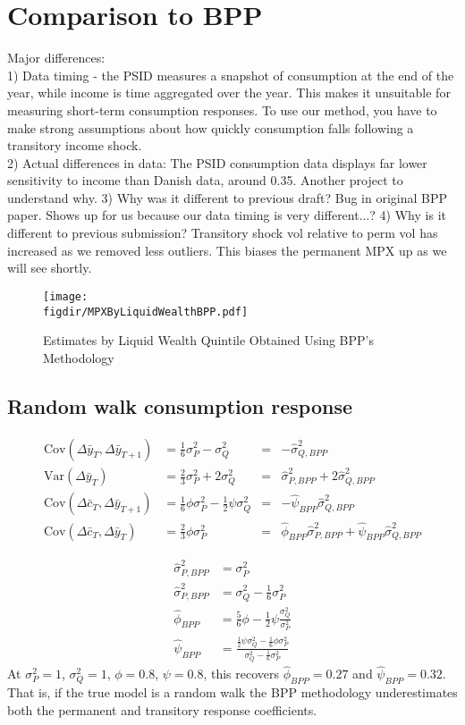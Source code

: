 \documentclass[12pt]{article}
\newcommand{\figdir}{../../Code/Rcode/Figures/AEJ_revision}
\begin{document}
\section{Comparison to BPP}
Major differences:\\
1) Data timing - the PSID measures a snapshot of consumption at the end of the year, while income is time aggregated over the year. This makes it unsuitable for measuring short-term consumption responses. To use our method, you have to make strong assumptions about how quickly consumption falls following a transitory income shock.\\
2) Actual differences in data: The PSID consumption data displays far lower sensitivity to income than Danish data, around 0.35. Another project to understand why.
3) Why was it different to previous draft? Bug in original BPP paper. Shows up for us because our data timing is very different...?
4) Why is it different to previous submission? Transitory shock vol relative to perm vol has increased as we removed less outliers. This biases the permanent MPX up as we will see shortly.
	\begin{figure} 
	\begin{centering}
		\texttt{[image: \\figdir/MPXByLiquidWealthBPP.pdf]}
		\caption{Estimates by Liquid Wealth Quintile Obtained Using BPP's Methodology}
		\label{fig:BPP_liquid}
	\end{centering}
\end{figure}
\subsection{Random walk consumption response}
\begin{align*}
	\mathrm{Cov}(\Delta \bar{y}_T, \Delta \bar{y}_{T+1}) &= \frac{1}{6} \sigma^2_P - \sigma^2_Q &= &-\hat{\sigma}^2_{Q,BPP} \\
	\mathrm{Var}(\Delta \bar{y}_T) &= \frac{2}{3} \sigma^2_P + 2\sigma^2_Q &= &\hat{\sigma}^2_{P,BPP} + 2\hat{\sigma}^2_{Q,BPP} \\
	\mathrm{Cov}(\Delta \bar{c}_T, \Delta \bar{y}_{T+1}) &= \frac{1}{6} \phi \sigma^2_P  - \frac{1}{2}\psi \sigma^2_Q &= &-\hat{\psi}_{BPP} \hat{\sigma}^2_{Q,BPP} \\
	\mathrm{Cov}(\Delta \bar{c}_T, \Delta \bar{y}_T) &= \frac{2}{3} \phi \sigma^2_P  &= &\hat{\phi}_{BPP}\hat{\sigma}^2_{P,BPP} +\hat{\psi}_{BPP}\hat{\sigma}^2_{Q,BPP}
\end{align*}

\begin{align*}
	\hat{\sigma}^2_{P,BPP} &= \sigma^2_P \\
	\hat{\sigma}^2_{P,BPP} &= \sigma^2_Q - \frac{1}{6}\sigma^2_P \\
	\hat{\phi}_{BPP} &=  \frac{5}{6}\phi - \frac{1}{2}\psi\frac{\sigma^2_Q}{\sigma^2_P} \\
	\hat{\psi}_{BPP} &=  \frac{  \frac{1}{2}\psi \sigma^2_Q - \frac{1}{6}\phi \sigma^2_P}{ \sigma^2_Q - \frac{1}{6} \sigma^2_P}
\end{align*}
At $\sigma^2_P=1$, $\sigma^2_Q=1$, $\phi=0.8$, $\psi=0.8$, this recovers $\hat{\phi}_{BPP}=0.27$ and $\hat{\psi}_{BPP}=0.32$. That is, if the true model is a random walk the BPP methodology underestimates both the permanent and transitory response coefficients.
\end{document}
